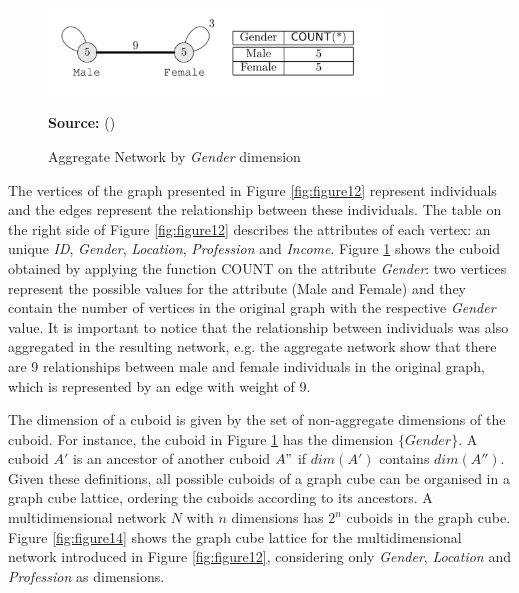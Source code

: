 \begin{figure}[ht]
\centering
\caption{Aggregate Network by \emph{Gender} dimension}
\label{fig:figure13}
\includegraphics[width=0.8\textwidth]{images/aggregate_graph.png}
\par\medskip\ABNTEXfontereduzida\selectfont\textbf{Source:} \citeauthor{Zhao2011} (\citeyear{Zhao2011}) \par\medskip
\end{figure}

The vertices of the graph presented in Figure \ref{fig:figure12} represent individuals and the edges represent the relationship between these individuals. The table on the right side of Figure \ref{fig:figure12} describes the attributes of each vertex: an unique \emph{ID}, \emph{Gender}, \emph{Location}, \emph{Profession} and \emph{Income}. Figure \ref{fig:figure13} shows the cuboid obtained by applying the function COUNT on the attribute \emph{Gender}: two vertices represent the possible values for the attribute (Male and Female) and they contain the number of vertices in the original graph with the respective \emph{Gender} value. It is important to notice that the relationship between individuals was also aggregated in the resulting network, e.g. the aggregate network show that there are 9 relationships between male and female individuals in the original graph, which is represented by an edge with weight of 9.

The dimension of a cuboid is given by the set of non-aggregate dimensions of the cuboid. For instance, the cuboid in Figure \ref{fig:figure13} has the dimension $\{Gender\}$. A cuboid $A'$ is an ancestor of another cuboid $A"$ if $dim(A')$ contains $dim(A'')$. Given these definitions, all possible cuboids of a graph cube can be organised in a graph cube lattice, ordering the cuboids according to its ancestors. A multidimensional network $N$ with $n$ dimensions has $2^n$ cuboids in the graph cube. Figure \ref{fig:figure14} shows the graph cube lattice for the multidimensional network introduced in Figure \ref{fig:figure12}, considering only \emph{Gender}, \emph{Location} and \emph{Profession} as dimensions.

